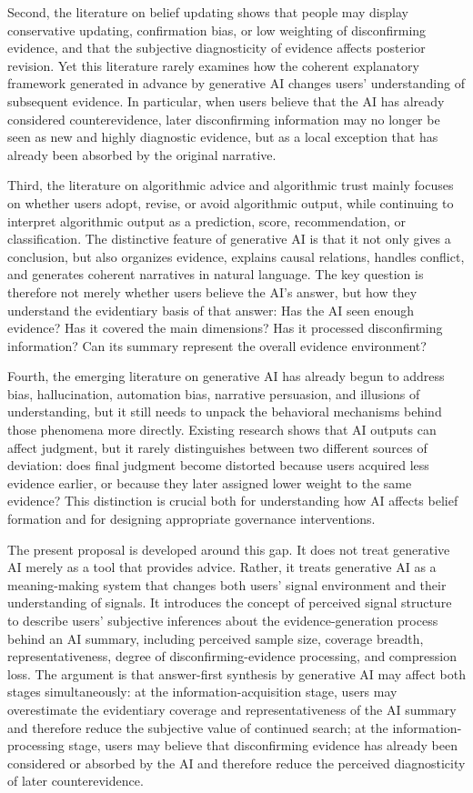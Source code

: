 Second, the literature on belief updating shows that people may display conservative updating, confirmation bias, or low weighting of disconfirming evidence, and that the subjective diagnosticity of evidence affects posterior revision. Yet this literature rarely examines how the coherent explanatory framework generated in advance by generative AI changes users' understanding of subsequent evidence. In particular, when users believe that the AI has already considered counterevidence, later disconfirming information may no longer be seen as new and highly diagnostic evidence, but as a local exception that has already been absorbed by the original narrative.

Third, the literature on algorithmic advice and algorithmic trust mainly focuses on whether users adopt, revise, or avoid algorithmic output, while continuing to interpret algorithmic output as a prediction, score, recommendation, or classification. The distinctive feature of generative AI is that it not only gives a conclusion, but also organizes evidence, explains causal relations, handles conflict, and generates coherent narratives in natural language. The key question is therefore not merely whether users believe the AI's answer, but how they understand the evidentiary basis of that answer: Has the AI seen enough evidence? Has it covered the main dimensions? Has it processed disconfirming information? Can its summary represent the overall evidence environment?

Fourth, the emerging literature on generative AI has already begun to address bias, hallucination, automation bias, narrative persuasion, and illusions of understanding, but it still needs to unpack the behavioral mechanisms behind those phenomena more directly. Existing research shows that AI outputs can affect judgment, but it rarely distinguishes between two different sources of deviation: does final judgment become distorted because users acquired less evidence earlier, or because they later assigned lower weight to the same evidence? This distinction is crucial both for understanding how AI affects belief formation and for designing appropriate governance interventions.

The present proposal is developed around this gap. It does not treat generative AI merely as a tool that provides advice. Rather, it treats generative AI as a meaning-making system that changes both users' signal environment and their understanding of signals. It introduces the concept of perceived signal structure to describe users' subjective inferences about the evidence-generation process behind an AI summary, including perceived sample size, coverage breadth, representativeness, degree of disconfirming-evidence processing, and compression loss. The argument is that answer-first synthesis by generative AI may affect both stages simultaneously: at the information-acquisition stage, users may overestimate the evidentiary coverage and representativeness of the AI summary and therefore reduce the subjective value of continued search; at the information-processing stage, users may believe that disconfirming evidence has already been considered or absorbed by the AI and therefore reduce the perceived diagnosticity of later counterevidence.

